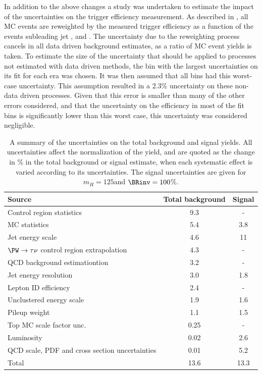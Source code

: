In addition to the above changes a study was undertaken to estimate the impact of the uncertainties on the trigger efficiency measurement. As described in , all \ac{MC} events are reweighted by the measured trigger efficiency as a function of the events subleading jet \pt, \METnoMU and \Mjj. The uncertainty due to the reweighting process cancels in all data driven background estimates, as a ratio of \ac{MC} event yields is taken. To estimate the size of the uncertainty that should be applied to processes not estimated with data driven methods, the bin with the largest uncertainties on its fit for each era was chosen. It was then assumed that all bins had this worst-case uncertainty. This assumption resulted in a 2.3\% uncertainty on these non-data driven processes. Given that this error is smaller than many of the other errors considered, and that the uncertainty on the efficiency in most of the fit bins is significantly lower than this worst case, this uncertainty was considered negligible.

\begin{table}
\caption{A summary of the uncertainties on the total background and signal yields. All uncertainties affect the normalization of the yield, and are quoted as the change in \% in the total background or signal estimate, when each systematic effect is varied according to its uncertainties. The signal uncertainties are given for $m_{H}=125$\GeV and $\BRinv=100$\%.}
\label{tab:parkedsyst}
\begin{tabular}{lcc}
\hline \hline
Source  & Total background & Signal     \\
\hline
Control region statistics & 9.3 & - \\
MC statistics & 5.4 & 3.8 \\
Jet energy scale & 4.6 & 11 \\
$\PW\rightarrow\tau\nu$ control region extrapolation & 4.3 & - \\
QCD background estimationtion & 3.2 & - \\
Jet energy resolution & 3.0 & 1.8 \\
Lepton ID efficiency & 2.4 & - \\
Unclustered energy scale & 1.9 & 1.6 \\
Pileup weight & 1.1 & 1.5 \\
Top MC scale factor unc. & 0.25 & - \\
Luminosity & 0.02 & 2.6 \\
QCD scale, PDF and cross section uncertainties & 0.01 & 5.2 \\
\hline
Total & 13.6 & 13.3 \\
\hline \hline
\end{tabular}
\end{table}



